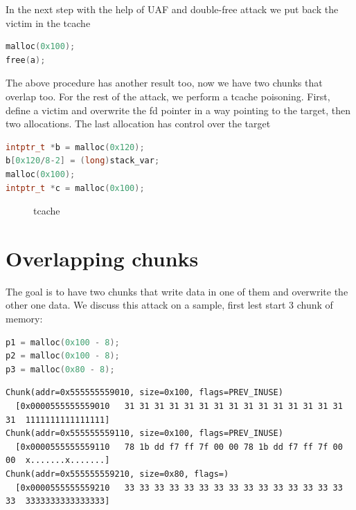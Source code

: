 \documentclass{masterthesis}
\newcommand*\tch{tcache}
\begin{document}
In the next step with the help of UAF and double-free attack we put back the victim in the \tch{}

\begin{lstlisting}[language=c,frame=tlrb]
malloc(0x100);
free(a);
\end{lstlisting}

The above procedure has another result too, now we have two chunks that overlap too. For the rest of the attack, we perform a \tch{} poisoning. First, define a victim and overwrite the fd pointer in a way pointing to the target, then two allocations. The last allocation has control over the target

\begin{lstlisting}[language=c,frame=tlrb]
intptr_t *b = malloc(0x120);
b[0x120/8-2] = (long)stack_var;
malloc(0x100);
intptr_t *c = malloc(0x100);
\end{lstlisting}

 \begin{figure}[h!]
  \caption{\tch{}}
\end{figure}


\section{ Overlapping chunks}
The goal is to have two chunks that write data in one of them and overwrite the other one data. We discuss this attack on a sample, first lest start 3 chunk of memory:

\begin{lstlisting}[language=c,frame=tlrb]
p1 = malloc(0x100 - 8);
p2 = malloc(0x100 - 8);
p3 = malloc(0x80 - 8);
\end{lstlisting}

\begin{lstlisting}[frame=tlrb]
Chunk(addr=0x555555559010, size=0x100, flags=PREV_INUSE)
  [0x0000555555559010   31 31 31 31 31 31 31 31 31 31 31 31 31 31 31 31  1111111111111111]
Chunk(addr=0x555555559110, size=0x100, flags=PREV_INUSE)
  [0x0000555555559110   78 1b dd f7 ff 7f 00 00 78 1b dd f7 ff 7f 00 00  x.......x.......]
Chunk(addr=0x555555559210, size=0x80, flags=)
  [0x0000555555559210   33 33 33 33 33 33 33 33 33 33 33 33 33 33 33 33  3333333333333333]
\end{lstlisting}
\end{document}

